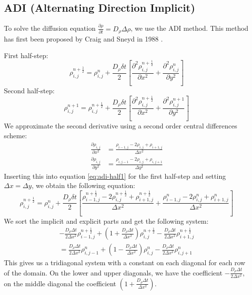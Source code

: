\documentclass[a4paper]{article}
\begin{document}
\subsection{ADI (Alternating Direction Implicit)}

To solve the diffusion equation $\frac{\partial \rho}{\partial t} = D_\rho \Delta \rho$, we use the ADI method.
This method has first been proposed by Craig and Sneyd in 1988 \cite{Craig_Sneyd_1988}.

First half-step:
\begin{equation}
	\rho_{i,j}^{n+\frac{1}{2}} = \rho_{i,j}^n + \frac{D_\rho \delta t}{2} \left[ \frac{\partial^2 \rho_{i,j}^{n+\frac{1}{2}}}{\partial x^2} + \frac{\partial^2 \rho_{i,j}^n}{\partial y^2} \right]
	\label{eq:adi-half1}
\end{equation}
Second half-step:
\begin{equation}
	\rho_{i,j}^{n+1} = \rho_{i,j}^{n+\frac{1}{2}} + \frac{D_\rho \delta t}{2} \left[ \frac{\partial^2 \rho_{i,j}^{n+\frac{1}{2}}}{\partial x^2} + \frac{\partial^2 \rho_{i,j}^{n+1}}{\partial y^2} \right]
	\label{eq:adi-half2}
\end{equation}
We approximate the second derivative using a second order central differences scheme:
\begin{align}
	\frac{\partial \rho_{i,j}}{\partial x^2} &= \frac{\rho_{i-1,j} - 2 \rho_{i,j} + \rho_{i+1,j}}{\Delta x^2} \\
	\frac{\partial \rho_{i,j}}{\partial y^2} &= \frac{\rho_{i,j-1} - 2 \rho_{i,j} + \rho_{i,j+1}}{\Delta y^2}
\end{align}
Inserting this into equation \ref{eq:adi-half1} for the first half-step and setting $\Delta x = \Delta y$, we obtain the following equation:
\begin{equation}
	\rho_{i,j}^{n+\frac{1}{2}} = \rho_{i,j}^n + \frac{D_\rho \delta t}{2} \left[ \frac{\rho_{i-1,j}^{n+\frac{1}{2}} - 2 \rho_{i,j}^{n+\frac{1}{2}} + \rho_{i+1,j}^{n+\frac{1}{2}}}{\Delta x^2} + \frac{\rho_{i-1,j}^n - 2 \rho_{i,j}^n + \rho_{i+1,j}^n}{\Delta x^2} \right]
\end{equation}
We sort the implicit and explicit parts and get the following system:
\begin{multline}
	-\frac{D_\rho \Delta t}{2 \Delta x^2} \rho_{i-1,j}^{n + \frac{1}{2}} + \left( 1 + \frac{D_\rho \Delta t}{\Delta x^2} \right) \rho_{i,j}^{n + \frac{1}{2}} - \frac{D_\rho \Delta t}{2 \Delta x^2} \rho_{i+1,j}^{n + \frac{1}{2}} \\
	= \frac{D_\rho \Delta t}{2 \Delta x^2} \rho_{i,j-1}^n + \left( 1 - \frac{D_\rho \Delta t}{\Delta x^2} \right) \rho_{i,j}^n - \frac{D_\rho \Delta t}{2 \Delta x^2} \rho_{i,j+1}^n
\end{multline}
This gives us a tridiagonal system with a constant on each diagonal for each row of the domain.
On the lower and upper diagonals, we have the coefficient $-\frac{D_\rho \Delta t}{2 \Delta x^2}$, on the middle diagonal the coefficient $\left( 1 + \frac{D_\rho \Delta t}{\Delta x^2} \right)$.
\end{document}
